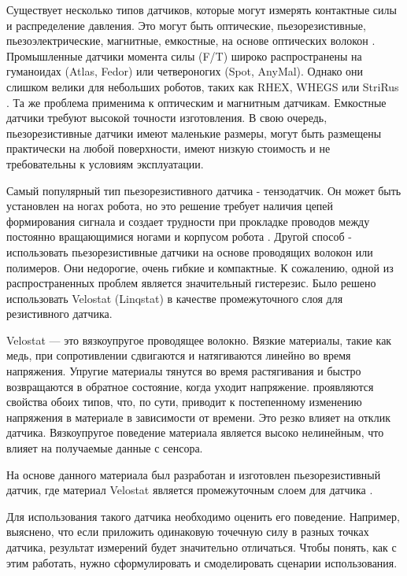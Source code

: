 Существует несколько типов датчиков, которые могут измерять контактные силы и распределение давления. Это могут быть оптические, пьезорезистивные, пьезоэлектрические, магнитные, емкостные, на основе оптических волокон \cite{howe_dynamic_1993}. Промышленные датчики момента силы (F/T) широко распространены на гуманоидах (Atlas, Fedor) или четвероногих (Spot, AnyMal). Однако они слишком велики для небольших роботов, таких как RHEX, WHEGS или StriRus \cite{saranli_design_2000,schroerComparingCockroachWhegs2004, bulichevConceptDevelopmentBiomimetic2018}. Та же проблема применима к оптическим и магнитным датчикам. Емкостные датчики требуют высокой точности изготовления. В свою очередь, пьезорезистивные датчики имеют маленькие размеры, могут быть размещены практически на любой поверхности, имеют низкую стоимость и не требовательны к условиям эксплуатации.

Самый популярный тип пьезорезистивного датчика - тензодатчик. Он может быть установлен на ногах робота, но это решение требует наличия цепей формирования сигнала и создает трудности при прокладке проводов между постоянно вращающимися ногами и корпусом робота \cite{wuTactileSensingTerrainBased2020}. Другой способ - использовать пьезорезистивные датчики на основе проводящих волокон или полимеров. Они недорогие, очень гибкие и компактные. К сожалению, одной из распространенных проблем является значительный гистерезис. Было решено использовать Velostat (Linqstat)\cite{vehecFlexibleResistiveSensor2020} в качестве промежуточного слоя для резистивного датчика.

Velostat --- это вязкоупругое проводящее волокно. Вязкие материалы, такие как медь, при сопротивлении сдвигаются и натягиваются линейно во время напряжения. Упругие материалы тянутся во время растягивания и быстро возвращаются в обратное состояние, когда уходит напряжение. проявляются свойства обоих типов, что, по сути, приводит к постепенному  изменению напряжения в материале в зависимости от времени. Это резко влияет на отклик датчика.
Вязкоупругое поведение материала является высоко нелинейным, что влияет на получаемые данные с сенсора.

На основе данного материала был разработан и изготовлен пьезорезистивный датчик, где материал Velostat  является промежуточным слоем для датчика . 

Для использования такого датчика необходимо оценить его поведение. Например, выяснено, что если приложить одинаковую точечную силу в разных точках датчика, результат измерений будет значительно отличаться. Чтобы понять, как с этим работать, нужно сформулировать и смоделировать сценарии использования.

